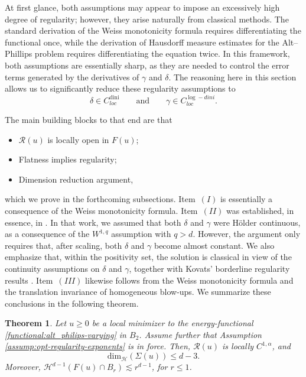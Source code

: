 \documentclass[reqno,11pt]{amsart}
\newtheorem{theorem}{Theorem}[section]
\newcommand{\1}{\mathds{1}}  %
\numberwithin{equation}{section}
\begin{document}
At first glance, both assumptions may appear to impose an excessively high degree of regularity; however, they arise naturally from classical methods. The standard derivation of the Weiss monotonicity formula requires differentiating the functional once, while the derivation of Hausdorff measure estimates for the Alt--Phillips problem requires differentiating the equation twice. In this framework, both assumptions are essentially sharp, as they are needed to control the error terms generated by the derivatives of \(\gamma\) and \(\delta\). The reasoning here in this section allows us to significantly reduce these regularity assumptions to
\begin{equation}\label{assump:opt-regularity-exponents}
     \delta \in C^{\mathrm{dini}}_{loc} \qquad \text{and} \qquad \gamma \in C^{\log-dini}_{loc}.
\end{equation}

The main building blocks to that end are that
\begin{itemize}
    \item[(I)] $\mathcal{R}(u)$ is locally open in $F(u)$;
    \item[(II)] Flatness implies regularity;
    \item[(III)] Dimension reduction argument,
\end{itemize}
which we prove in the forthcoming subsections. Item~\((I)\) is essentially a consequence of the Weiss monotonicity formula. Item~\((II)\) was established, in essence, in \cite[Section~7]{ASTU1}. In that work, we assumed that both \(\delta\) and \(\gamma\) were H\"older continuous, as a consequence of the \(W^{1,q}\) assumption with \(q>d\). However, the argument only requires that, after scaling, both \(\delta\) and \(\gamma\) become almost constant. We also emphasize that, within the positivity set, the solution is classical in view of the continuity assumptions on \(\delta\) and \(\gamma\), together with Kovats' borderline regularity results \cite{JK1}. Item~\((III)\) likewise follows from the Weiss monotonicity formula and the translation invariance of homogeneous blow-ups. We summarize these conclusions in the following theorem.

\begin{theorem}\label{thm:main-thm-varying-AP}
Let $u \geq 0$ be a local minimizer to the energy-functional \eqref{functional:alt_philips-varying} in $B_2$. Assume further that Assumption \eqref{assump:opt-regularity-exponents} is in force. Then, $\mathcal{R}(u)$ is locally $C^{1,\alpha}$, and
\[
	\mathrm{dim}_\mathcal{H}\left(\Sigma(u)\right) \le d-3.
\]
Moreover, $\mathcal{H}^{d-1}(F(u)\cap B_r) \lesssim r^{d-1}$, for $r \leq 1$.
\end{theorem}
\end{document}
